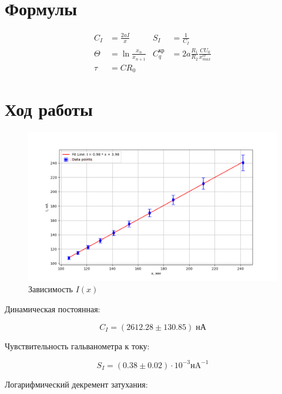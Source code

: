 \documentclass[a4paper, 12pt]{article}
\begin{document}
\section*{Формулы}

\begin{align*}
    C_I &= \frac{2aI}{x} & S_I &= \frac{1}{C_I} \\
    \Theta &= \ln{\frac{x_n}{x_{n+1}}} & C^{\text{кр}}_q &= 2a \frac{R_1}{R_2} \frac{CU_0}{x^{cr}_{max}} \\
    \tau &= CR_0
\end{align*}


\section*{Ход работы}

\begin{figure}[H]
    \captionsetup{position=above, skip=2pt}
    \centering
    \caption{Зависимость $I(x)$}
    \includegraphics[width=\textwidth]{I_x/graphs/combined_graph.png}
\end{figure}

\newpage

Динамическая постоянная:

\begin{equation}
    C_I = (2612.28 \pm 130.85) \; \text{нА}
\end{equation}


Чувствительность гальванометра к току:

\begin{equation}
    S_I =( 0.38 \pm 0.02) \cdot 10^{-3} {\text{нA}}^{-1}
\end{equation}


Логарифмический декремент затухания:
\end{document}
